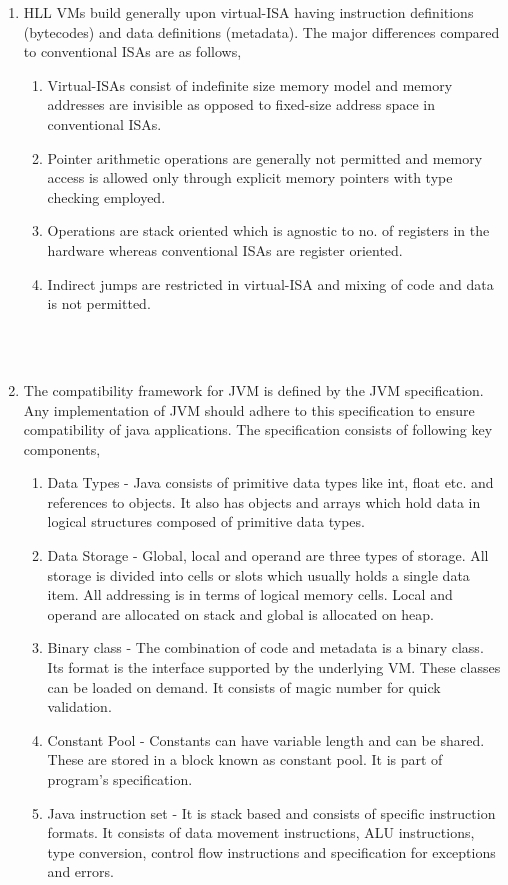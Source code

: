 \documentclass[11pt,a4paper,oneside]{article}
\begin{document}
\begin{enumerate}
		\item HLL VMs build generally upon virtual-ISA having instruction definitions (bytecodes) and data definitions (metadata). The major differences compared to conventional ISAs are as follows,
		\begin{enumerate}
			\item Virtual-ISAs consist of indefinite size memory model and memory addresses are invisible as opposed to fixed-size address space in conventional ISAs.
			\item Pointer arithmetic operations are generally not permitted and memory access is allowed only through explicit memory pointers with type checking employed.
			\item Operations are stack oriented which is agnostic to no. of registers in the hardware whereas conventional ISAs are register oriented.
			\item Indirect jumps are restricted in virtual-ISA and mixing of code and data is not permitted.
	    \end{enumerate}	
    
        \begin{verbatim}
                
        
        \end{verbatim}	
		
		\item The compatibility framework for JVM is defined by the JVM specification. Any implementation of JVM should adhere to this specification to ensure compatibility of java applications. The specification consists of following key components,
		\begin{enumerate}
			\item Data Types - Java consists of primitive data types like int, float etc. and references to objects. It also has objects and arrays which hold data in logical structures composed of primitive data types.
			\item Data Storage - Global, local and operand are three types of storage. All storage is divided into cells or slots which usually holds a single data item. All addressing is in terms of logical memory cells. Local and operand are allocated on stack and global is allocated on heap.
			\item Binary class - The combination of code and metadata is a binary class. Its format is the interface supported by the underlying VM. These classes can be loaded on demand. It consists of magic number for quick validation.
			\item Constant Pool - Constants can have variable length and can be shared. These are stored in a block known as constant pool. It is part of program's specification.
			\item Java instruction set - It is stack based and consists of specific instruction formats. It consists of data movement instructions, ALU instructions, type conversion, control flow instructions and specification for exceptions and errors.
		\end{enumerate}
		

\end{enumerate}
\end{document}
